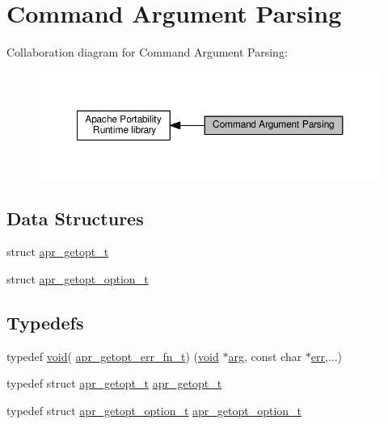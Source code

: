 \hypertarget{group__apr__getopt}{}\section{Command Argument Parsing}
\label{group__apr__getopt}
Collaboration diagram for Command Argument Parsing\+:
\nopagebreak
\begin{figure}[H]
\begin{center}
\leavevmode
\includegraphics[width=350pt]{group__apr__getopt}
\end{center}
\end{figure}
\subsection*{Data Structures}
\begin{DoxyCompactItemize}
\item 
struct \hyperlink{structapr__getopt__t}{apr\+\_\+getopt\+\_\+t}
\item 
struct \hyperlink{structapr__getopt__option__t}{apr\+\_\+getopt\+\_\+option\+\_\+t}
\end{DoxyCompactItemize}
\subsection*{Typedefs}
\begin{DoxyCompactItemize}
\item 
typedef \hyperlink{group__MOD__ISAPI_gacd6cdbf73df3d9eed42fa493d9b621a6}{void}( \hyperlink{group__apr__getopt_ga67c949e3d93e50e12347acd92a3bbe18}{apr\+\_\+getopt\+\_\+err\+\_\+fn\+\_\+t}) (\hyperlink{group__MOD__ISAPI_gacd6cdbf73df3d9eed42fa493d9b621a6}{void} $\ast$\hyperlink{group__APACHE__CORE__MUTEX_gaf6517210150d97cd5cb8a17e3768770d}{arg}, const char $\ast$\hyperlink{group__apr__thread__proc_ga156fcecee9d33dd7b55c3d8fdaba7159}{err},...)
\item 
typedef struct \hyperlink{structapr__getopt__t}{apr\+\_\+getopt\+\_\+t} \hyperlink{group__apr__getopt_gaed49565eab64803e93f76d0c40d6873d}{apr\+\_\+getopt\+\_\+t}
\item 
typedef struct \hyperlink{structapr__getopt__option__t}{apr\+\_\+getopt\+\_\+option\+\_\+t} \hyperlink{group__apr__getopt_ga114d2af52f3573eaeee2ffa73b2c4ff5}{apr\+\_\+getopt\+\_\+option\+\_\+t}
\end{DoxyCompactItemize}
